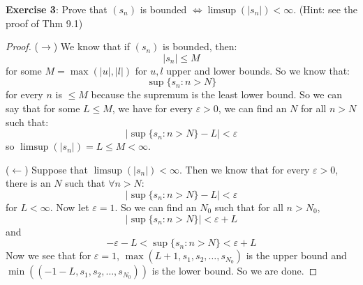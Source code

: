 \documentclass{article}
\begin{document}
\textbf{Exercise 3}: Prove that $(s_{n})$ is bounded $\iff \mathop{limsup}(\lvert s_{n} \rvert) < \infty$. (Hint: see the proof of Thm 9.1)
    \begin{proof}
        ($\rightarrow $) We know that if $(s_{n})$ is bounded, then:
            \begin{equation*}
                \lvert s_{n} \rvert \leq M
            \end{equation*}
        for some $M = \max(\lvert u \rvert, \lvert l \rvert)$ for $u, l$ upper and lower bounds. So we know that:
            \begin{equation*}
                \mathop{sup}\{s_{n} : n > N\}
            \end{equation*}
        for every $n$ is $\leq M$ because the supremum is the least lower bound. So we can say that for some $L \leq M$, we have for every $\varepsilon > 0$, we can find an $N$ for all $n> N$ such that:
            \begin{equation*}
                \lvert \mathop{sup}\{s_{n} : n> N\} - L \rvert < \varepsilon
            \end{equation*}
        so $\mathop{limsup}(\lvert s_{n} \rvert) = L \leq M < \infty$. 

        ($\leftarrow $) Suppose that $\mathop{limsup}(\lvert s_{n} \rvert) < \infty$. Then we know that for every $\varepsilon > 0$, there is an $N$ such that $\forall n> N$:
            \begin{equation*}
                \lvert \mathop{sup}\{s_{n} : n> N\} - L \rvert < \varepsilon
            \end{equation*}
        for $L < \infty$. Now let $\varepsilon = 1$. So we can find an $N_{0}$ such that for all $n > N_{0}$, 
            \begin{equation*}
                \lvert \mathop{sup}\{s_{n} : n> N\} \rvert <  \varepsilon + L
            \end{equation*}
        and 
            \begin{equation*}
                -\varepsilon - L < \mathop{sup}\{s_{n} : n > N\} < \varepsilon + L
            \end{equation*}
        Now we see that for $\varepsilon = 1$, $\max(L + 1, s_{1}, s_{2}, \ldots , s_{N_{0}})$ is the upper bound and $\min((-1 - L, s_{1}, s_{2}, \ldots , s_{N_{0}}))$ is the lower bound. So we are done.
    \end{proof}
\end{document}
